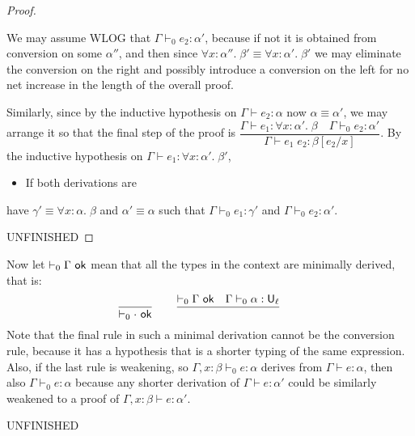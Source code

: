 \begin{proof}
\begin{itemize}
We may assume WLOG that $\Gamma\vdash_0 e_2:\alpha'$, because if not it is obtained from conversion on some $\alpha''$, and then since $\forall x:\alpha''.\;\beta'\equiv\forall x:\alpha'.\;\beta'$ we may eliminate the conversion on the right and possibly introduce a conversion on the left for no net increase in the length of the overall proof.

Similarly, since by the inductive hypothesis on $\Gamma\vdash e_2:\alpha$ now $\alpha\equiv\alpha'$, we may arrange it so that the final step of the proof is $\dfrac{\Gamma\vdash e_1:\forall x:\alpha'.\;\beta\quad \Gamma\vdash_0 e_2:\alpha'}{\Gamma\vdash e_1\;e_2:\beta[e_2/x]}$.
By the inductive hypothesis on $\Gamma\vdash e_1:\forall x:\alpha'.\;\beta'$,
\begin{itemize}
\item If both derivations are 
\end{itemize} have $\gamma'\equiv\forall x:\alpha.\;\beta$ and $\alpha'\equiv\alpha$ such that $\Gamma\vdash_0 e_1:\gamma'$ and $\Gamma\vdash_0 e_2:\alpha'$.
\end{itemize}
UNFINISHED
\end{proof}
Now let $\vdash_0\Gamma\ok$ mean that all the types in the context are minimally derived, that is:
$$\frac{}{\vdash_0\cdot\ok}\qquad\frac{\vdash_0\Gamma\ok\quad\Gamma\vdash_0\alpha:\U_\ell}{}\qquad$$
Note that the final rule in such a minimal derivation cannot be the conversion rule, because it has a hypothesis that is a shorter typing of the same expression. Also, if the last rule is weakening, so $\Gamma,x:\beta\vdash_0e:\alpha$ derives from $\Gamma\vdash e:\alpha$, then also $\Gamma\vdash_0e:\alpha$ because any shorter derivation of $\Gamma\vdash e:\alpha'$ could be similarly weakened to a proof of $\Gamma,x:\beta\vdash e:\alpha'$.

UNFINISHED


